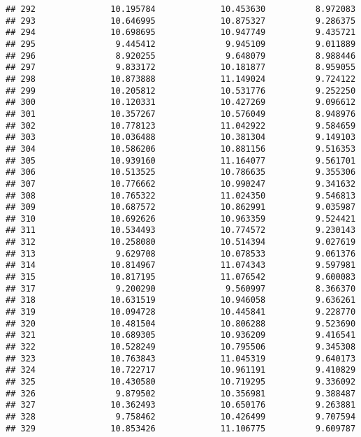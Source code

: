 \documentclass[
]{article}
\begin{document}
\begin{verbatim}
## 292               10.195784             10.453630          8.972083
## 293               10.646995             10.875327          9.286375
## 294               10.698695             10.947749          9.435721
## 295                9.445412              9.945109          9.011889
## 296                8.920255              9.648079          8.988446
## 297                9.833172             10.181877          8.959055
## 298               10.873888             11.149024          9.724122
## 299               10.205812             10.531776          9.252250
## 300               10.120331             10.427269          9.096612
## 301               10.357267             10.576049          8.948976
## 302               10.778123             11.042922          9.584659
## 303               10.036488             10.381304          9.149103
## 304               10.586206             10.881156          9.516353
## 305               10.939160             11.164077          9.561701
## 306               10.513525             10.786635          9.355306
## 307               10.776662             10.990247          9.341632
## 308               10.765322             11.024350          9.546813
## 309               10.687572             10.862991          9.035987
## 310               10.692626             10.963359          9.524421
## 311               10.534493             10.774572          9.230143
## 312               10.258080             10.514394          9.027619
## 313                9.629708             10.078533          9.061376
## 314               10.814967             11.074343          9.597981
## 315               10.817195             11.076542          9.600083
## 317                9.200290              9.560997          8.366370
## 318               10.631519             10.946058          9.636261
## 319               10.094728             10.445841          9.228770
## 320               10.481504             10.806288          9.523690
## 321               10.689305             10.936209          9.416541
## 322               10.528249             10.795506          9.345308
## 323               10.763843             11.045319          9.640173
## 324               10.722717             10.961191          9.410829
## 325               10.430580             10.719295          9.336092
## 326                9.879502             10.356981          9.388487
## 327               10.362493             10.650176          9.263881
## 328                9.758462             10.426499          9.707594
## 329               10.853426             11.106775          9.609787

\end{verbatim}
\end{document}
